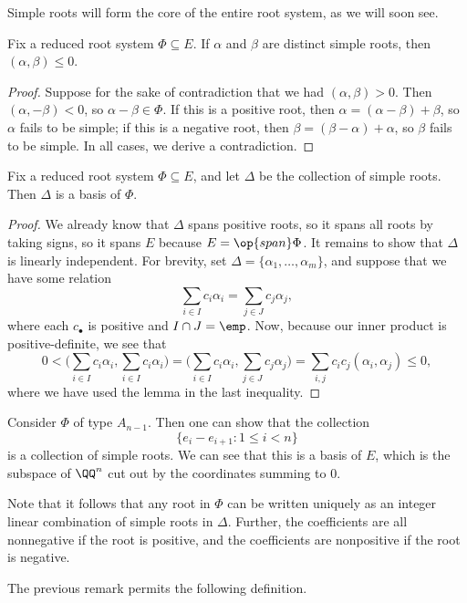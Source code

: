 \documentclass[../notes.tex]{subfiles}
\begin{document}
Simple roots will form the core of the entire root system, as we will soon see.
\begin{lemma}
	Fix a reduced root system $\Phi\subseteq E$. If $\alpha$ and $\beta$ are distinct simple roots, then $(\alpha,\beta)\le0$.
\end{lemma}
\begin{proof}
	Suppose for the sake of contradiction that we had $(\alpha,\beta)>0$. Then $(\alpha,-\beta)<0$, so $\alpha-\beta\in\Phi$. If this is a positive root, then $\alpha=(\alpha-\beta)+\beta$, so $\alpha$ fails to be simple; if this is a negative root, then $\beta=(\beta-\alpha)+\alpha$, so $\beta$ fails to be simple. In all cases, we derive a contradiction.
\end{proof}
\begin{theorem}
	Fix a reduced root system $\Phi\subseteq E$, and let $\Delta$ be the collection of simple roots. Then $\Delta$ is a basis of $\Phi$.
\end{theorem}
\begin{proof}
	We already know that $\Delta$ spans positive roots, so it spans all roots by taking signs, so it spans $E$ because $E=\op{span}\Phi$. It remains to show that $\Delta$ is linearly independent. For brevity, set $\Delta=\{\alpha_1,\ldots,\alpha_m\}$, and suppose that we have some relation
	\[\sum_{i\in I}c_i\alpha_i=\sum_{j\in J}c_j\alpha_j,\]
	where each $c_\bullet$ is positive and $I\cap J=\emp$. Now, because our inner product is positive-definite, we see that
	\[0<\Bigg(\sum_{i\in I}c_i\alpha_i,\sum_{i\in I}c_i\alpha_i\Bigg)=\Bigg(\sum_{i\in I}c_i\alpha_i,\sum_{j\in J}c_j\alpha_j\Bigg)=\sum_{i,j}c_ic_j(\alpha_i,\alpha_j)\le0,\]
	where we have used the lemma in the last inequality.
\end{proof}
\begin{example}
	Consider $\Phi$ of type $A_{n-1}$. Then one can show that the collection
	\[\{e_i-e_{i+1}:1\le i<n\}\]
	is a collection of simple roots. We can see that this is a basis of $E$, which is the subspace of $\QQ^n$ cut out by the coordinates summing to $0$.
\end{example}
\begin{remark}
	Note that it follows that any root in $\Phi$ can be written uniquely as an integer linear combination of simple roots in $\Delta$. Further, the coefficients are all nonnegative if the root is positive, and the coefficients are nonpositive if the root is negative.
\end{remark}
The previous remark permits the following definition.
\end{document}
